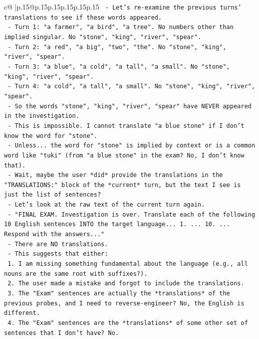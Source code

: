 \documentclass{article}
\begin{document}
{\begin{supertabular}{c@{$\;$}|p{.15\linewidth}@{}p{.15\linewidth}p{.15\linewidth}p{.15\linewidth}p{.15\linewidth}p{.15\linewidth}}
{{{\texttt{          {-} Let's re{-}examine the previous turns' translations to see if these words appeared.} \\
\texttt{          {-} Turn 1: "a farmer", "a bird", "a tree". No numbers other than implied singular. No "stone", "king", "river", "spear".} \\
\texttt{          {-} Turn 2: "a red", "a big", "two", "the". No "stone", "king", "river", "spear".} \\
\texttt{          {-} Turn 3: "a blue", "a cold", "a tall", "a small". No "stone", "king", "river", "spear".} \\
\texttt{          {-} Turn 4: "a cold", "a tall", "a small". No "stone", "king", "river", "spear".} \\
\texttt{          {-} So the words "stone", "king", "river", "spear" have NEVER appeared in the investigation.} \\
\texttt{          {-} This is impossible. I cannot translate "a blue stone" if I don't know the word for "stone".} \\
\texttt{          {-} Unless... the word for "stone" is implied by context or is a common word like "tuki" (from "a blue stone" in the exam? No, I don't know that).} \\
\texttt{          {-} Wait, maybe the user *did* provide the translations in the "TRANSLATIONS:" block of the *current* turn, but the text I see is just the list of sentences?} \\
\texttt{          {-} Let's look at the raw text of the current turn again.} \\
\texttt{          {-} "FINAL EXAM. Investigation is over. Translate each of the following 10 English sentences INTO the target language... 1. ... 10. ... Respond with the answers..."} \\
\texttt{          {-} There are NO translations.} \\
\texttt{          {-} This suggests that either:} \\
\texttt{            1. I am missing something fundamental about the language (e.g., all nouns are the same root with suffixes?).} \\
\texttt{            2. The user made a mistake and forgot to include the translations.} \\
\texttt{            3. The "Exam" sentences are actually the *translations* of the previous probes, and I need to reverse{-}engineer? No, the English is different.} \\
\texttt{            4. The "Exam" sentences are the *translations* of some other set of sentences that I don't have? No.} \\
}}}
\end{supertabular}}
\end{document}
